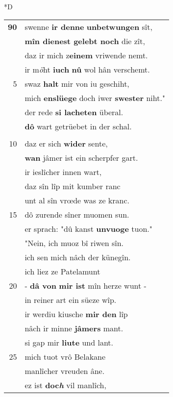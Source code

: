 \documentclass[8pt,a4paper,notitlepage]{article}
\begin{document}
\begin{table}[ht]
\begin{minipage}[t]{0.5\linewidth}
\small
\begin{center}*D
\end{center}
\begin{tabular}{rl}
\textbf{90} & swenne \textbf{ir denne} \textbf{unbetwungen} sît,\\ 
 & \textbf{mîn dienest gelebt noch} die zît,\\ 
 & daz ir mich z\textbf{einem} vriwende nemt.\\ 
 & ir m\textit{ö}ht \textbf{iuch} \textbf{nû} wol hân verschemt.\\ 
5 & swaz \textbf{halt} mir von iu geschiht,\\ 
 & mich \textbf{enslüege} doch iwer \textbf{swester} niht."\\ 
 & der rede \textbf{si lacheten} überal.\\ 
 & \textbf{dô} wart getrüebet in der schal.\\ 
 & \textit{\begin{large}D\end{large}}en wirt sîn triwe mente,\\ 
10 & daz er sich \textbf{wider} sente,\\ 
 & \textbf{wan} jâmer ist ein scherpfer gart.\\ 
 & ir ieslîcher innen wart,\\ 
 & daz sîn lîp mit kumber ranc\\ 
 & unt al sîn vrœde was ze kranc.\\ 
15 & dô zurende sîner muomen sun.\\ 
 & er sprach: "dû kanst \textbf{unvuoge} tuon."\\ 
 & "Nein, ich muoz bî riwen sîn.\\ 
 & ich sen mich nâch der künegîn.\\ 
 & ich liez ze Patelamunt\\ 
20 & - \textbf{dâ von} \textbf{mir ist} mîn herze wunt -\\ 
 & in reiner art ein süeze wîp.\\ 
 & ir werdiu kiusche \textbf{mir den} lîp\\ 
 & nâch ir minne \textbf{jâmers} mant.\\ 
 & si gap mir \textbf{liute} und lant.\\ 
25 & mich tuot vrô Belakane\\ 
 & manlîcher vreuden âne.\\ 
 & ez ist \textbf{doc\textit{h}} vil manlîch,\\ 

\end{tabular}
\end{minipage}
\end{table}
\end{document}
